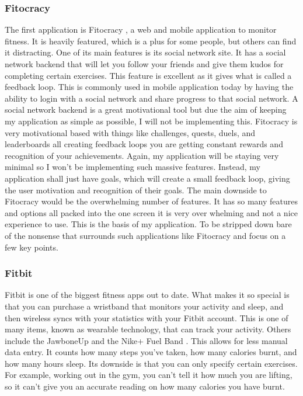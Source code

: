 \subsubsection{Fitocracy}
The first application is Fitocracy \citep{fitocracy}, a web and mobile application to monitor fitness. It is heavily featured, which is a plus for some people, but others can find it distracting. One of its main features is its social network site. It has a social network backend that will let you follow your friends and give them kudos for completing certain exercises. This feature is excellent as it gives what is called a feedback loop. This is commonly used in mobile application today by having the ability to login with a social network and share progress to that social network. A social network backend is a great motivational tool but due the aim of keeping my application as simple as possible, I will not be implementing this. Fitocracy is very motivational based with things like challenges, quests, duels, and leaderboards all creating feedback loops you are getting constant rewards and recognition of your achievements. Again, my application will be staying very minimal so I won’t be implementing such massive features. Instead, my application shall just have goals, which will create a small feedback loop, giving the user motivation and recognition of their goals. The main downside to Fitocracy would be the overwhelming number of features. It has so many features and options all packed into the one screen it is very over whelming and not a nice experience to use. This is the basis of my application. To be stripped down bare of the nonsense that surrounds such applications like Fitocracy and focus on a few key points.


\subsubsection{Fitbit}
Fitbit is one of the biggest fitness apps out to date. What makes it so special is that you can purchase a wristband that monitors your activity and sleep, and then wireless syncs with your statistics with your Fitbit account. This is one of many items, known as wearable technology, that can track your activity. Others include the JawboneUp \citep{jawbone} and the Nike+ Fuel Band \citep{nikefuelband}. This allows for less manual data entry. It counts how many steps you’ve taken, how many calories burnt, and how many hours sleep. Its downside is that you can only specify certain exercises. For example, working out in the gym, you can’t tell it how much you are lifting, so it can’t give you an accurate reading on how many calories you have burnt.

